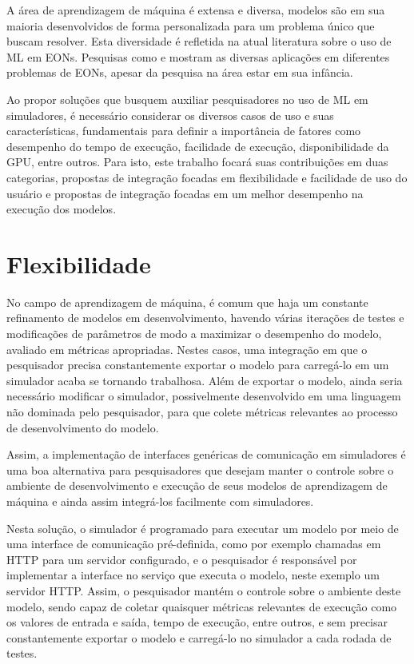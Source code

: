 A área de aprendizagem de máquina é extensa e diversa, modelos são em sua maioria desenvolvidos de forma personalizada para um problema único que buscam resolver. Esta diversidade é refletida na atual literatura sobre o uso de ML em EONs. Pesquisas como \cite{eon_ml_survey_2020} e \cite{8527529} mostram as diversas aplicações em diferentes problemas de EONs, apesar da pesquisa na área estar em sua infância.

Ao propor soluções que busquem auxiliar pesquisadores no uso de ML em simuladores, é necessário considerar os diversos casos de uso e suas características, fundamentais para definir a importância de fatores como desempenho do tempo de execução, facilidade de execução, disponibilidade da GPU, entre outros. Para isto, este trabalho focará suas contribuições em duas categorias, propostas de integração focadas em flexibilidade e facilidade de uso do usuário e propostas de integração focadas em um melhor desempenho na execução dos modelos.

\section{Flexibilidade}

No campo de aprendizagem de máquina, é comum que haja um constante refinamento de modelos em desenvolvimento, havendo várias iterações de testes e modificações de parâmetros de modo a maximizar o desempenho do modelo, avaliado em métricas apropriadas. Nestes casos, uma integração em que o pesquisador precisa constantemente exportar o modelo para carregá-lo em um simulador acaba se tornando trabalhosa. Além de exportar o modelo, ainda seria necessário modificar o simulador, possivelmente desenvolvido em uma linguagem não dominada pelo pesquisador, para que colete métricas relevantes ao processo de desenvolvimento do modelo.

Assim, a implementação de interfaces genéricas de comunicação em simuladores é uma boa alternativa para pesquisadores que desejam manter o controle sobre o ambiente de desenvolvimento e execução de seus modelos de aprendizagem de máquina e ainda assim integrá-los facilmente com simuladores.

Nesta solução, o simulador é programado para executar um modelo por meio de uma interface de comunicação pré-definida, como por exemplo chamadas em HTTP para um servidor configurado, e o pesquisador é responsável por implementar a interface no serviço que executa o modelo, neste exemplo um servidor HTTP. Assim, o pesquisador mantém o controle sobre o ambiente deste modelo, sendo capaz de coletar quaisquer métricas relevantes de execução como os valores de entrada e saída, tempo de execução, entre outros, e sem precisar constantemente exportar o modelo e carregá-lo no simulador a cada rodada de testes.

